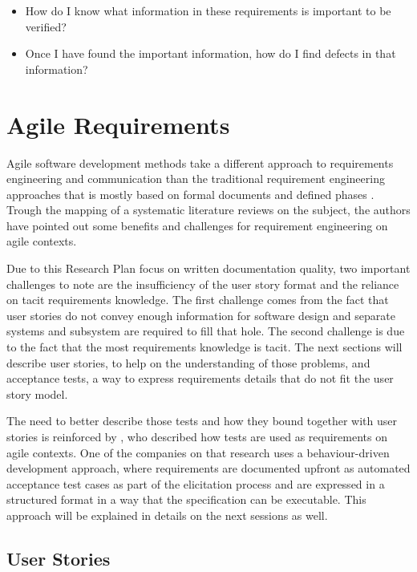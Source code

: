 \begin{itemize}
    \item How do I know what information in these requirements is important to be verified?
    \item Once I have found the important information, how do I find defects in that information?
\end{itemize}

\section{Agile Requirements}

Agile software development methods take a different approach to requirements engineering and communication than the traditional requirement engineering approaches that is mostly based on formal documents and defined phases \cite{Heikkila_2015}. Trough the mapping of a systematic literature reviews on the subject, the authors have pointed out some benefits and challenges for requirement engineering on agile contexts. 

Due to this Research Plan focus on written documentation quality, two important challenges to note are the insufficiency of the user story format and the reliance on tacit requirements knowledge. The first challenge comes from the fact that user stories do not convey enough information for software design and separate systems and subsystem are required to fill that hole. The second challenge is due to the fact that the most requirements knowledge is tacit. The next sections will describe user stories, to help on the understanding of those problems, and acceptance tests, a way to express requirements details that do not fit the user story model. 

The need to better describe those tests and how they bound together with user stories is reinforced by \cite{Bjarnason_2016}, who described how tests are used as requirements on agile contexts. One of the companies on that research uses a behaviour-driven development approach, where requirements are documented upfront as automated acceptance test cases as part of the elicitation process and are expressed in a structured format in a way that the specification can be executable. This approach will be explained in details on the next sessions as well.

\subsection{User Stories}

